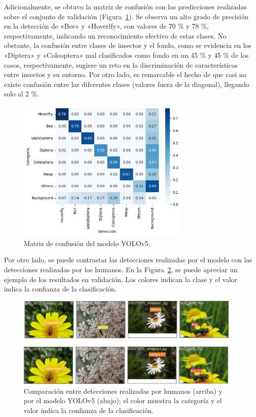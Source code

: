 Adicionalmente, se obtuvo la matriz de confusión con las predicciones realizadas sobre el conjunto de validación (Figura~\ref{fig:matriz_confusion_yolov5}). Se observa un alto grado de precisión en la detección de «Bee» y «Hoverlfy», con valores de 70 \% y 78 \%, respectivamente, indicando un reconocimiento efectivo de estas clases. No obstante, la confusión entre clases de insectos y el fondo, como se evidencia en los «Diptera» y «Coleoptera» mal clasificados como fondo en un 45 \% y 45 \% de los casos, respectivamente, sugiere un reto en la discriminación de características entre insectos y su entorno. Por otro lado, es remarcable el hecho de que casi no existe confusión entre las diferentes clases (valores fuera de la diagonal), llegando solo al 2 \%.

\begin{figure}[H]
    \centering
    \includegraphics[width=0.75\textwidth]{Figuras/matriz_confusion_yolov5.png}
    \caption{Matriz de confusión del modelo YOLOv5.}
    \label{fig:matriz_confusion_yolov5}
\end{figure}

Por otro lado, se puede contrastar las detecciones realizadas por el modelo con las detecciones realizadas por los humanos. En la Figura~\ref{fig:comparacion_humanos_yolov5}, se puede apreciar un ejemplo de los resultados en validación. Los colores indican la clase y el valor indica la confianza de la clasificación.

\begin{figure}[H]
    \centering
    \includegraphics[width=0.98\textwidth]{Figuras/comparacion.png}
    \caption[Comparación entre detecciones realizadas por humanos y por el modelo YOLOv5.]{Comparación entre detecciones realizadas por humanos (arriba) y por el modelo YOLOv5 (abajo); el color muestra la categoría y el valor indica la confianza de la clasificación.}
    \label{fig:comparacion_humanos_yolov5}
\end{figure}


